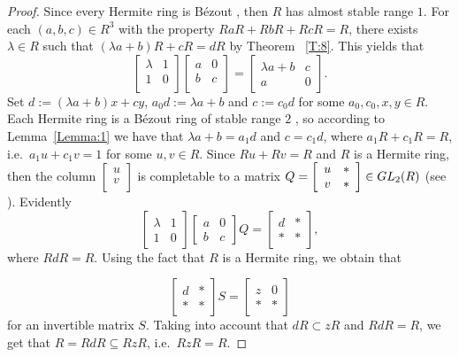 \documentclass[10pt,a4paper]{amsart}
\def\GL{\rm GL}
\theoremstyle{plain}
\theoremstyle{definition}
\begin{document}
\begin{proof}
Since every  Hermite ring is B\'ezout  \cite[Corolary 2.13]{12-zabavsky},
then $R$  has almost stable range $1$.  For each $(a,b,c)\in R^3$ with the property  $RaR+RbR+RcR=R$,  there exists $\lambda \in R$ such  that $(\lambda a+b)R+cR=dR$ by Theorem ~\ref{T:8}. This yields that
\[
\left[\begin{array}{cc}
\lambda&1\\
1&0\\
\end{array}
\right]
\left[\begin{array}{cc}
a&0\\
b&c\\
\end{array}\right]=\left[\begin{array}{cc}\lambda a+b& c\\a&0\end{array}\right].
\]
Set $d:=(\lambda a+b)x+cy$,  $a_0d:=\lambda a+b$ and  $c:=c_0d$ for some $a_0,c_0,x,y\in R$. Each Hermite ring is a B\'ezout ring of stable range $2$ \cite[Theorem~1.2.40]{12-zabavsky}, so  according to Lemma~\ref{Lemma:1} we have that $\lambda a+b=a_1d$ and  $c=c_1d$, where $a_1R+c_1R=R$,
i.e.~$a_1u+c_1v=1$ for some $u,v\in R$. Since $Ru+Rv=R$ and $R$ is a Hermite ring, then the  column
$\left[\begin{array}{c}
u \\
v\\
\end{array}\right]$
is completable   to a  matrix $
Q=\left[\begin{array}{cc}

        u & * \\
        v & *
\end{array}\right]\in \GL_2(R)$ (see  \cite[Corolary 2.1.7]{12-zabavsky}). Evidently
\[
\left[\begin{array}{cc}\lambda& 1\\1&0\end{array}\right]\left[\begin{array}{cc}a&0\\b&c\end{array}\right]Q=\left[\begin{array}{cc}d& *\\ * & *\end{array}\right],
\]
where $RdR=R$. Using the fact that  $R$ is a Hermite ring,  we obtain that

\[
\left[\begin{array}{cc} d& *\\ * & *\end{array}\right]S=
\left[\begin{array}{cc}z& 0\\ * & *\end{array}\right]
\]
for an invertible  matrix $S$. Taking into account that   $dR\subset zR$ and $RdR=R$, we get that  $R=RdR\subseteq RzR$, i.e.~$RzR=R$.
\end{proof}
\end{document}
